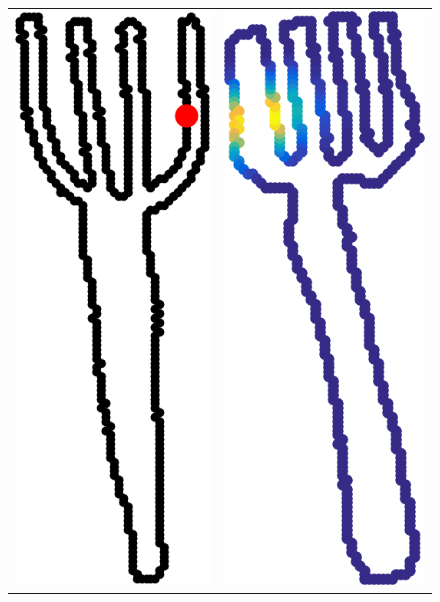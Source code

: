 \setlength{\columnsep}{2pt}
\begin{figure}\centering
\vspace{-.15in}
\begin{tabular}{cc}
\includegraphics[height=.9\linewidth]{figures/2d_shape_match/source_fuzzy_fork.pdf}&
\includegraphics[height=.9\linewidth]{figures/2d_shape_match/target_fuzzy_fork.pdf}
\end{tabular}
\vspace{-.15in}
\caption{}\label{fig:forks}
\end{figure}

